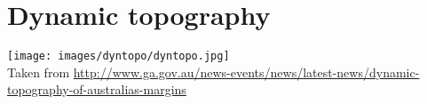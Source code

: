 \section{Dynamic topography} 

\begin{center}
\texttt{[image: images/dyntopo/dyntopo.jpg]}\\
{\captionfont Taken from \url{http://www.ga.gov.au/news-events/news/latest-news/dynamic-topography-of-australias-margins}}
\end{center}


